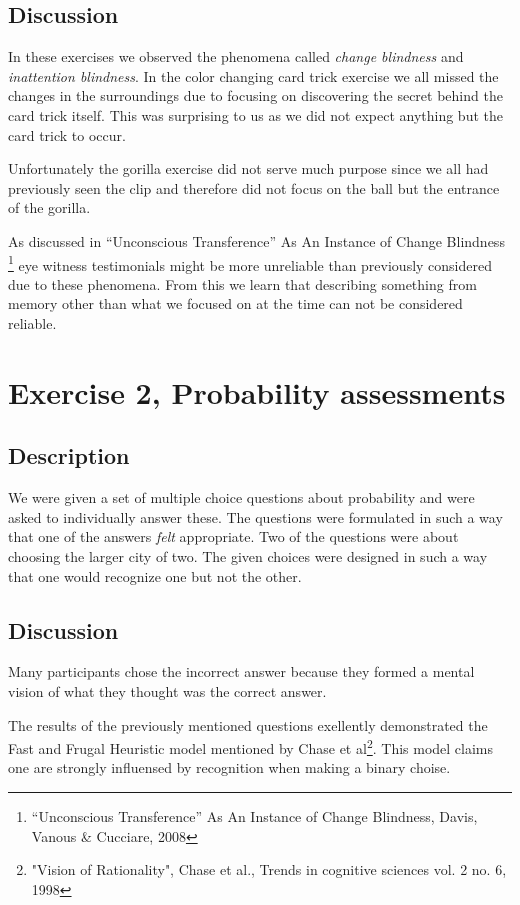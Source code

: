\documentclass[10pt, a4paper]{article}
\begin{document}
\subsection{Discussion}
In these exercises we observed the phenomena called \emph{change blindness} and \emph{inattention blindness}. In the color changing card trick exercise we all missed the changes in the surroundings due to focusing on discovering the secret behind the card trick itself. This was surprising to us as we did not expect anything but the card trick to occur. 

Unfortunately the gorilla exercise did not serve much purpose since we all had previously seen the clip and therefore did not focus on the ball but the entrance of the gorilla. 

As discussed in “Unconscious Transference” As An Instance of Change Blindness \footnote{“Unconscious Transference” As An Instance of Change Blindness, Davis, Vanous \& Cucciare, 2008} eye witness testimonials might be more unreliable than previously considered due to these phenomena. From this we learn that describing something from memory other than what we focused on at the time can not be considered reliable. 

\section{Exercise 2, Probability assessments}
\subsection{Description}
We were given a set of multiple choice questions about probability and were asked to individually answer these. 
The questions were formulated in such a way that one of the answers \emph{felt} appropriate.
Two of the questions were about choosing the larger city of two. The given choices were designed in such a way that one would recognize one but not the other. 

\subsection{Discussion}
Many participants chose the incorrect answer because they formed a mental vision of what they thought was the correct answer. 

The results of the previously mentioned questions exellently demonstrated the Fast and Frugal Heuristic model mentioned by Chase et al\footnote{"Vision of Rationality", Chase et al., Trends in cognitive sciences vol. 2 no. 6, 1998}. This model claims one are strongly influensed by recognition when making a binary choise. 
\end{document}

